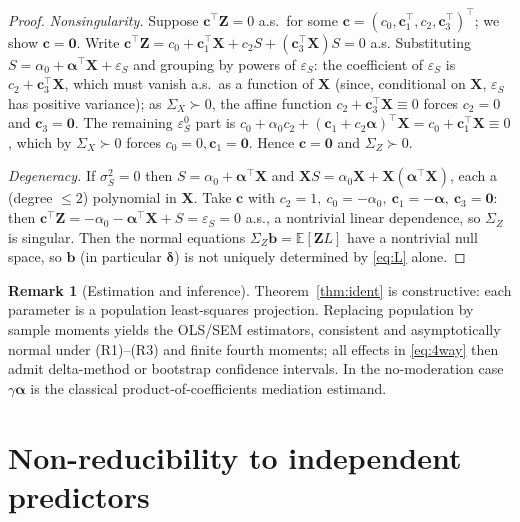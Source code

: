 \documentclass{amsart}
\theoremstyle{definition}
\newtheorem{remark}{Remark}
\theoremstyle{plain}
\begin{document}
\begin{proof}
\emph{Nonsingularity.} Suppose $\bm c^\top\bm Z=0$ a.s.\ for some
$\bm c=(c_0,\bm c_1^\top,c_2,\bm c_3^\top)^\top$; we show $\bm c=\bm0$. Write
$\bm c^\top\bm Z=c_0+\bm c_1^\top\bm X+c_2 S+(\bm c_3^\top\bm X)S=0$ a.s. Substituting
$S=\alpha_0+\bm\alpha^\top\bm X+\varepsilon_S$ and grouping by powers of $\varepsilon_S$:
the coefficient of $\varepsilon_S$ is $c_2+\bm c_3^\top\bm X$, which must vanish a.s.\ as a
function of $\bm X$ (since, conditional on $\bm X$, $\varepsilon_S$ has positive variance);
as $\Sigma_X\succ0$, the affine function $c_2+\bm c_3^\top\bm X\equiv0$ forces $c_2=0$ and
$\bm c_3=\bm0$. The remaining $\varepsilon_S^0$ part is
$c_0+\alpha_0 c_2+(\bm c_1+c_2\bm\alpha)^\top\bm X=c_0+\bm c_1^\top\bm X\equiv0$, which by
$\Sigma_X\succ0$ forces $c_0=0,\bm c_1=\bm0$. Hence $\bm c=\bm0$ and $\Sigma_Z\succ0$.

\emph{Degeneracy.} If $\sigma_S^2=0$ then $S=\alpha_0+\bm\alpha^\top\bm X$ and
$\bm X S=\alpha_0\bm X+\bm X(\bm\alpha^\top\bm X)$, each a (degree $\le2$) polynomial in
$\bm X$. Take $\bm c$ with $c_2=1,\ c_0=-\alpha_0,\ \bm c_1=-\bm\alpha,\ \bm c_3=\bm0$: then
$\bm c^\top\bm Z=-\alpha_0-\bm\alpha^\top\bm X+S=\varepsilon_S=0$ a.s., a nontrivial linear
dependence, so $\Sigma_Z$ is singular. Then the normal equations $\Sigma_Z\bm b
=\mathbb E[\bm Z L]$ have a nontrivial null space, so $\bm b$ (in particular $\bm\delta$) is
not uniquely determined by \eqref{eq:L} alone.
\end{proof}

\begin{remark}[Estimation and inference]
Theorem~\ref{thm:ident} is constructive: each parameter is a population least-squares
projection. Replacing population by sample moments yields the OLS/SEM estimators, consistent
and asymptotically normal under (R1)--(R3) and finite fourth moments; all effects in
\eqref{eq:4way} then admit delta-method or bootstrap confidence intervals. In the
no-moderation case $\gamma\bm\alpha$ is the classical product-of-coefficients mediation
estimand.
\end{remark}

\section{Non-reducibility to independent predictors}
\end{document}
